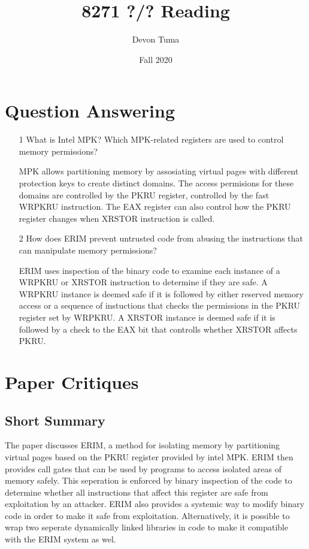 \documentclass[11pt]{article}
\title{8271 ?/? Reading}
\author{Devon Tuma}
\date{Fall 2020}
\begin{document}
\maketitle

\section*{Question Answering}

\begin{itemize}
\item [1] What is Intel MPK? Which MPK-related registers are used to control memory permissions?

  MPK allows partitioning memory by assosiating virtual pages with different protection keys to create distinct domains.
  The access permisions for these domains are controlled by the PKRU register, controlled by the fast WRPKRU instruction.
  The EAX register can also control how the PKRU register changes when XRSTOR instruction is called.
  
\item [2] How does ERIM prevent untrusted code from abusing the instructions that can manipulate memory permissions?

  ERIM uses inspection of the binary code to examine each instance of a WRPKRU or XRSTOR instruction to determine if they are safe.
  A WRPKRU instance is deemed safe if it is followed by either reserved memory access or a sequence of instuctions that checks the permissions in the PKRU register set by WRPKRU.
  A XRSTOR instance is deemed safe if it is followed by a check to the EAX bit that controlls whether XRSTOR affects PKRU.
  
\end{itemize}

\section*{Paper Critiques}

\subsection*{Short Summary}

The paper discusses ERIM, a method for isolating memory by partitioning virtual pages based on the PKRU register provided by intel MPK.
ERIM then provides call gates that can be used by programs to access isolated areas of memory safely.
This seperation is enforced by binary inspection of the code to determine whether all instructions that affect this register are safe from exploitation by an attacker.
ERIM also provides a systemic way to modify binary code in order to make it safe from exploitation.
Alternatively, it is possible to wrap two seperate dynamically linked libraries in code to make it compatible with the ERIM system as wel.
\end{document}
